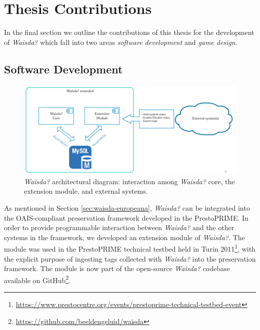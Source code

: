 \section{Thesis Contributions} 
In the final section we outline the contributions of this thesis for the development of \textit{Waisda?} which fall into two areas \textit{software development} and \textit{game design}.
\subsection{Software Development}\label{chap:waisda:thesis-soft}

\begin{figure}[t!]
\centering
\includegraphics[width=\columnwidth]{waisda-diagram} 
\caption{\textit{Waisda?} architectural diagram: interaction among \textit{Waisda?} core, the extension module, and external systems.}
\label{waisda-diagram}
\end{figure}

As mentioned in Section \ref{sec:waisda-europeana}, \textit{Waisda?} can be integrated into the OAIS-compliant preservation framework developed in the PrestoPRIME. In order to provide programmable interaction between \textit{Waisda?} and the other systems in the framework, we developed an extension module of \textit{Waisda?}. The module was used in the PrestoPRIME technical testbed held in Turin 2011\footnote{\url{https://www.prestocentre.org/events/prestoprime-technical-testbed-event}}, with the explicit purpose of ingesting tags collected with \textit{Waisda?} into the preservation framework. The module is now part of the open-source \textit{Waisda?} codebase available on GitHub\footnote{\url{https://github.com/beeldengeluid/waisda}}.


